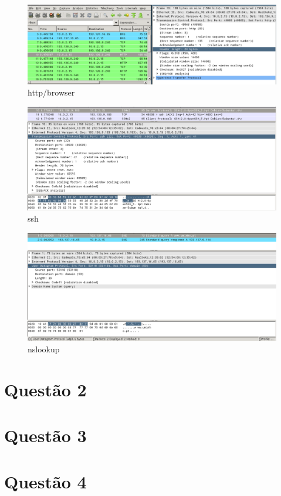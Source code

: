 \documentclass[a4paper]{report}
\begin{document}
\begin{figure}[H]
    \centering 
    \includegraphics[width=\textwidth]{images/http_browser.png}  
    \caption{http/browser}
    \label{fig:http_browser}
\end{figure}

\begin{figure}[H]
    \centering 
    \includegraphics[width=\textwidth]{images/ssh.png}  
    \caption{ssh}
    \label{fig:ssh}
\end{figure}

\begin{figure}[H]
    \centering 
    \includegraphics[width=\textwidth]{images/nslookup.png}  
    \caption{nslookup}
    \label{fig:nslookup}
\end{figure}

\chapter{Questão 2}


\chapter{Questão 3}


\chapter{Questão 4}
\end{document}
